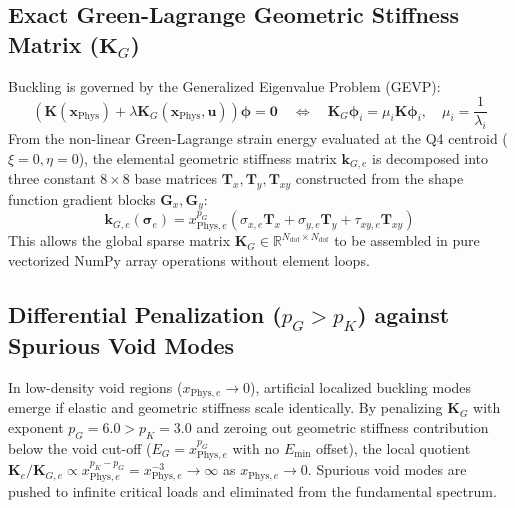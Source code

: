 \documentclass[11pt, a4paper]{article}
\begin{document}
\subsection{Exact Green-Lagrange Geometric Stiffness Matrix ($\mathbf{K}_G$)}
Buckling is governed by the Generalized Eigenvalue Problem (GEVP):
\begin{equation}
    \left( \mathbf{K}(\mathbf{x}_{\text{Phys}}) + \lambda \mathbf{K}_G(\mathbf{x}_{\text{Phys}}, \mathbf{u}) \right) \boldsymbol{\phi} = \mathbf{0} \quad \Longleftrightarrow \quad \mathbf{K}_G \boldsymbol{\phi}_i = \mu_i \mathbf{K} \boldsymbol{\phi}_i, \quad \mu_i = \frac{1}{\lambda_i}
\end{equation}
From the non-linear Green-Lagrange strain energy evaluated at the Q4 centroid ($\xi = 0, \eta = 0$), the elemental geometric stiffness matrix $\mathbf{k}_{G,e}$ is decomposed into three constant $8 \times 8$ base matrices $\mathbf{T}_x, \mathbf{T}_y, \mathbf{T}_{xy}$ constructed from the shape function gradient blocks $\mathbf{G}_x, \mathbf{G}_y$:
\begin{equation}
    \mathbf{k}_{G,e}(\boldsymbol{\sigma}_e) = x_{\text{Phys}, e}^{p_G} \left( \sigma_{x,e} \mathbf{T}_x + \sigma_{y,e} \mathbf{T}_y + \tau_{xy,e} \mathbf{T}_{xy} \right)
\end{equation}
This allows the global sparse matrix $\mathbf{K}_G \in \mathbb{R}^{N_{\text{dof}} \times N_{\text{dof}}}$ to be assembled in pure vectorized NumPy array operations without element loops.

\subsection{Differential Penalization ($p_G > p_K$) against Spurious Void Modes}
In low-density void regions ($x_{\text{Phys}, e} \to 0$), artificial localized buckling modes emerge if elastic and geometric stiffness scale identically. By penalizing $\mathbf{K}_G$ with exponent $p_G = 6.0 > p_K = 3.0$ and zeroing out geometric stiffness contribution below the void cut-off ($E_G = x_{\text{Phys}, e}^{p_G}$ with no $E_{\min}$ offset), the local quotient $\mathbf{K}_e / \mathbf{K}_{G,e} \propto x_{\text{Phys}, e}^{p_K - p_G} = x_{\text{Phys}, e}^{-3} \to \infty$ as $x_{\text{Phys}, e} \to 0$. Spurious void modes are pushed to infinite critical loads and eliminated from the fundamental spectrum.
\end{document}
